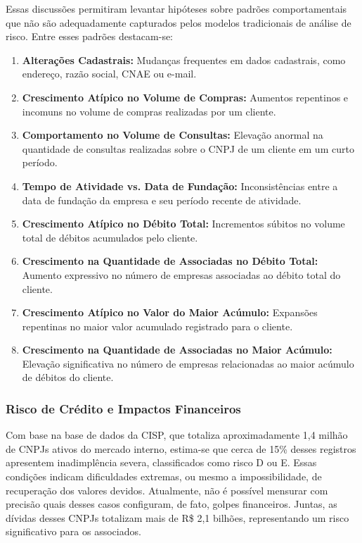 \documentclass[12pt,a4paper]{article}
\begin{document}
Essas discussões permitiram levantar hipóteses sobre padrões comportamentais que não são adequadamente capturados pelos modelos tradicionais de análise de risco. Entre esses padrões destacam-se:
\begin{enumerate}
    \item \textbf{Alterações Cadastrais:} Mudanças frequentes em dados cadastrais, como endereço, razão social, CNAE ou e-mail.
    \item \textbf{Crescimento Atípico no Volume de Compras:} Aumentos repentinos e incomuns no volume de compras realizadas por um cliente.
    \item \textbf{Comportamento no Volume de Consultas:} Elevação anormal na quantidade de consultas realizadas sobre o CNPJ de um cliente em um curto período.
    \item \textbf{Tempo de Atividade vs. Data de Fundação:} Inconsistências entre a data de fundação da empresa e seu período recente de atividade.
    \item \textbf{Crescimento Atípico no Débito Total:} Incrementos súbitos no volume total de débitos acumulados pelo cliente.
    \item \textbf{Crescimento na Quantidade de Associadas no Débito Total:} Aumento expressivo no número de empresas associadas ao débito total do cliente.
    \item \textbf{Crescimento Atípico no Valor do Maior Acúmulo:} Expansões repentinas no maior valor acumulado registrado para o cliente.
    \item \textbf{Crescimento na Quantidade de Associadas no Maior Acúmulo:} Elevação significativa no número de empresas relacionadas ao maior acúmulo de débitos do cliente.
\end{enumerate}

\subsubsection{Risco de Crédito e Impactos Financeiros}

Com base na base de dados da CISP, que totaliza aproximadamente 1,4 milhão de CNPJs ativos do mercado interno, estima-se que cerca de 15\% desses registros apresentem inadimplência severa, classificados como risco D ou E. Essas condições indicam dificuldades extremas, ou mesmo a impossibilidade, de recuperação dos valores devidos. Atualmente, não é possível mensurar com precisão quais desses casos configuram, de fato, golpes financeiros. Juntas, as dívidas desses CNPJs totalizam mais de R\$ 2,1 bilhões, representando um risco significativo para os associados.
\end{document}

